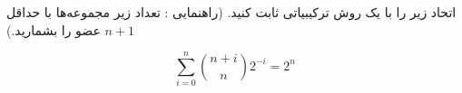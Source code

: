 \EXERCISE
اتحاد زير را با يک روش ترکيبياتی ثابت کنيد. (راهنمايی : تعداد زير مجموعه‌ها با حداقل 
$n + 1$
عضو را بشمارید.)

$$\sum_{i=0}^{n}\binom{n+i}{n}2^{-i} = 2^n$$
